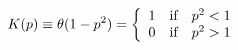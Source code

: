 \begin{equation}
K(p) \equiv \theta (1-p^2) = \left\{ \begin{array}
{r@{\quad\text{if}\quad}l} 1 & p^2 < 1\\ 0 & p^2 > 1 \end{array}
\right. \label{step}
\end{equation}


